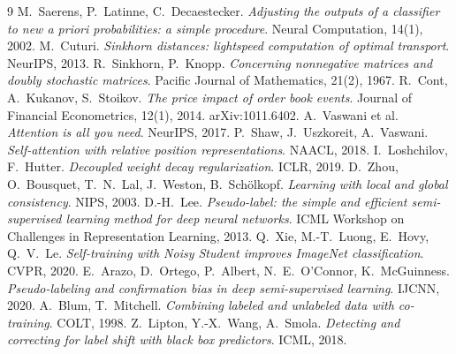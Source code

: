 \documentclass[11pt,a4paper]{article}
\theoremstyle{definition}
\theoremstyle{plain}
\theoremstyle{remark}
\newcommand{\1}{\mathbf{1}}
\begin{document}
\begin{thebibliography}{9}
 M.~Saerens, P.~Latinne, C.~Decaestecker. \emph{Adjusting the outputs of a classifier to new a priori probabilities: a simple procedure}. Neural Computation, 14(1), 2002.
 M.~Cuturi. \emph{Sinkhorn distances: lightspeed computation of optimal transport}. NeurIPS, 2013.
 R.~Sinkhorn, P.~Knopp. \emph{Concerning nonnegative matrices and doubly stochastic matrices}. Pacific Journal of Mathematics, 21(2), 1967.
 R.~Cont, A.~Kukanov, S.~Stoikov. \emph{The price impact of order book events}. Journal of Financial Econometrics, 12(1), 2014. arXiv:1011.6402.
 A.~Vaswani et al. \emph{Attention is all you need}. NeurIPS, 2017.
 P.~Shaw, J.~Uszkoreit, A.~Vaswani. \emph{Self-attention with relative position representations}. NAACL, 2018.
 I.~Loshchilov, F.~Hutter. \emph{Decoupled weight decay regularization}. ICLR, 2019.
 D.~Zhou, O.~Bousquet, T.~N.~Lal, J.~Weston, B.~Schölkopf. \emph{Learning with local and global consistency}. NIPS, 2003.
 D.-H.~Lee. \emph{Pseudo-label: the simple and efficient semi-supervised learning method for deep neural networks}. ICML Workshop on Challenges in Representation Learning, 2013.
 Q.~Xie, M.-T.~Luong, E.~Hovy, Q.~V.~Le. \emph{Self-training with Noisy Student improves ImageNet classification}. CVPR, 2020.
 E.~Arazo, D.~Ortego, P.~Albert, N.~E.~O'Connor, K.~McGuinness. \emph{Pseudo-labeling and confirmation bias in deep semi-supervised learning}. IJCNN, 2020.
 A.~Blum, T.~Mitchell. \emph{Combining labeled and unlabeled data with co-training}. COLT, 1998.
 Z.~Lipton, Y.-X.~Wang, A.~Smola. \emph{Detecting and correcting for label shift with black box predictors}. ICML, 2018.
\end{thebibliography}
\end{document}
